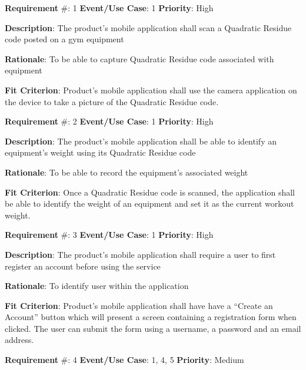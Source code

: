 \documentclass{article}
\newcommand\tab{\hspace*{2cm}}
\begin{document}





\textbf{Requirement} \#: 1 \tab \textbf{Event/Use Case}: 1
\tab \textbf{Priority}: High

\textbf{Description}: The product’s mobile application shall scan a Quadratic Residue code posted on a gym equipment

\textbf{Rationale}: To be able to capture Quadratic Residue code associated with equipment

\textbf{Fit Criterion}: Product’s mobile application shall use the camera application on the device to take a picture of the Quadratic Residue code.

\medskip

\textbf{Requirement} \#: 2 \tab \textbf{Event/Use Case}: 1
\tab \textbf{Priority}: High

\textbf{Description}: The product’s mobile application shall be able to identify an equipment’s weight using its Quadratic Residue code

\textbf{Rationale}: To be able to record the equipment’s associated weight

\textbf{Fit Criterion}: Once a Quadratic Residue code is scanned, the application shall be able to identify the weight of an equipment and set it as the current workout weight.

\medskip

\textbf{Requirement} \#: 3 \tab \textbf{Event/Use Case}: 1
\tab \textbf{Priority}: High

\textbf{Description}: The product’s mobile application shall require a user to first register an account before using the service

\textbf{Rationale}: To identify user within the application

\textbf{Fit Criterion}: Product’s mobile application shall have have a “Create an Account” button which will present a screen containing a registration form when clicked. The user can submit the form using a username, a password and an email address.

\medskip

\textbf{Requirement} \#: 4 \tab \textbf{Event/Use Case}: 1, 4, 5
\tab \textbf{Priority}: Medium
\end{document}
